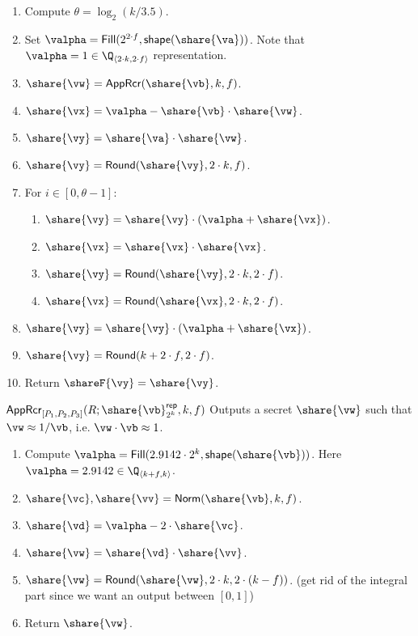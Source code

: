 \begin{enumerate}
    \item Compute $\theta = \log_2({k/3.5})$.
    \item Set $\valpha = \mathsf{Fill}(2^{2\cdot f},\mathsf{shape}(\share{\va}))$. Note that $\valpha = 1 \in \Q_{\langle 2\cdot k, 2\cdot f \rangle}$ representation.
    \item $\share{\vw} = \mathsf{AppRcr}(\share{\vb}, k, f)$.
    \item $\share{\vx} = \valpha - \share{\vb} \cdot \share{\vw}$.
    \item $\share{\vy} = \share{\va} \cdot \share{\vw}$.
    \item $\share{\vy} = \mathsf{Round}(\share{\vy}, 2\cdot k, f)$.
    \item For $i \in [0, \theta - 1]$:
  \begin{enumerate}
    \item $\share{\vy} = \share{\vy} \cdot (\valpha + \share{\vx})$.
    \item $\share{\vx} = \share{\vx} \cdot \share{\vx}$.
    \item $\share{\vy} = \mathsf{Round}(\share{\vy}, 2 \cdot k, 2 \cdot f)$.
    \item $\share{\vx} = \mathsf{Round}(\share{\vx}, 2\cdot k, 2\cdot f)$.
  \end{enumerate}
  \item $\share{\vy} = \share{\vy} \cdot (\valpha + \share{\vx})$.
  \item $\share{\vy} = \mathsf{Round}(k + 2 \cdot f, 2 \cdot f)$.
  \item Return $\shareF{\vy} = \share{\vy}$.
\end{enumerate}

\msubsubsection
  {$\mathsf{AppRcr}_{[P_1, P_2, P_3]}(R; \share{\vb}^\mathsf{rep}_{2^k}, k, f)$}
  Outputs a secret $\share{\vw}$ such that $\vw \approx 1/\vb$, i.e. $\vw \cdot \vb \approx 1$.
  \begin{enumerate}
    \item Compute $\valpha = \mathsf{Fill}(2.9142 \cdot 2^k,
    \mathsf{shape}(\share{\vb}))$. Here $\valpha = 2.9142 \in \Q_{\langle k + f,
    k\rangle}$.
    \item $\share{\vc}, \share{\vv} = \mathsf{Norm}(\share{\vb}, k, f)$.
    \item $\share{\vd} = \valpha - 2 \cdot \share{\vc}$.
    \item $\share{\vw} = \share{\vd} \cdot \share{\vv}$.
    \item $\share{\vw} = \mathsf{Round}(\share{\vw}, 2 \cdot k, 2 \cdot (k -
    f))$. (get rid of the integral part since we want an output between $[0, 1]$) \item Return
    $\share{\vw}$.
\end{enumerate}


